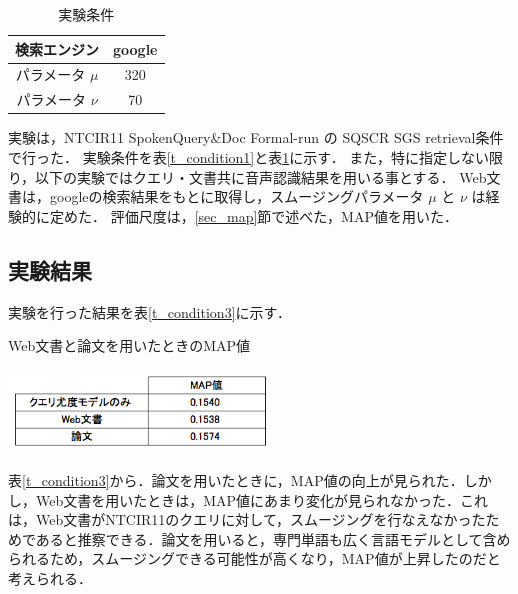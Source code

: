 \begin{table}[htbp]
    \begin{center}
        \caption{実験条件}
        \begin{tabular}{|c|c|}
            \hline
            検索エンジン & google \\ \hline
            パラメータ $\mu$ & 320 \\ \hline
            パラメータ $\nu$ & 70 \\ \hline
        \end{tabular}
        \label{t_condition2}
    \end{center}
\end{table}

実験は，NTCIR11 SpokenQuery\&Doc Formal-run の SQSCR SGS retrieval条件で行った．
実験条件を表\ref{t_condition1}と表\ref{t_condition2}に示す．
また，特に指定しない限り，以下の実験ではクエリ・文書共に音声認識結果を用いる事とする．
Web文書は，googleの検索結果をもとに取得し，スムージングパラメータ $\mu$ と $\nu$ は経験的に定めた．
評価尺度は，\ref{sec_map}節で述べた，MAP値を用いた．

\subsection{実験結果}
実験を行った結果を表\ref{t_condition3}に示す．

\begin{table}[htbp]
    \centering
    \caption{Web文書と論文を用いたときのMAP値}
    \includegraphics[width=7cm]{./image/t_condition.png}
    \label{t_condition3}
\end{table}

表\ref{t_condition3}から．論文を用いたときに，MAP値の向上が見られた．しかし，Web文書を用いたときは，MAP値にあまり変化が見られなかった．これは，Web文書がNTCIR11のクエリに対して，スムージングを行なえなかったためであると推察できる．論文を用いると，専門単語も広く言語モデルとして含められるため，スムージングできる可能性が高くなり，MAP値が上昇したのだと考えられる．








